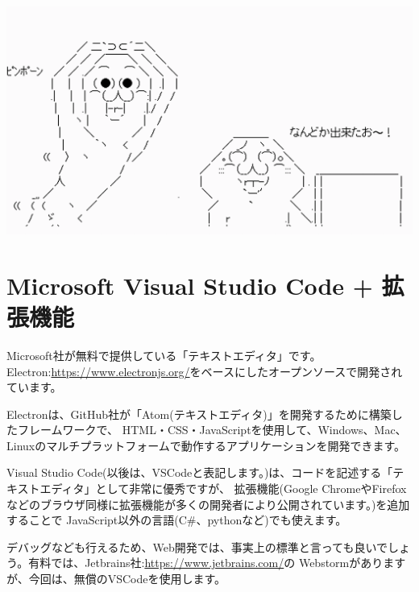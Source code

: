 \begin{reviewimage}%
\includegraphics[width=0.8\maxwidth]{./images/01-createDevEnv/hanamaru.png}%
\label{image:01-createDevEnv:hanamaru}
\end{reviewimage}

\section{Microsoft Visual Studio Code + 拡張機能}
\keeplastskip{
  \label{sec:1-2}
  \label{sec-vscode}
  \par\nobreak
}

Microsoft社が無料で提供している「テキストエディタ」です。Electron:\url{https://www.electronjs.org/}をベースにしたオープンソースで開発されています。

\vspace*{\baselineskip}

Electronは、GitHub社が「Atom(テキストエディタ)」を開発するために構築したフレームワークで、
HTML・CSS・JavaScriptを使用して、Windows、Mac、Linuxのマルチプラットフォームで動作するアプリケーションを開発できます。

\vspace*{\baselineskip}

Visual Studio Code(以後は、VSCodeと表記します。)は、コードを記述する「テキストエディタ」として非常に優秀ですが、
拡張機能(Google ChromeやFirefoxなどのブラウザ同様に拡張機能が多くの開発者により公開されています。)を追加することで
JavaScript以外の言語(C\#、pythonなど)でも使えます。

\vspace*{\baselineskip}

デバッグなども行えるため、Web開発では、事実上の標準と言っても良いでしょう。有料では、Jetbrains社:\url{https://www.jetbrains.com/}の
Webstormがありますが、今回は、無償のVSCodeを使用します。

